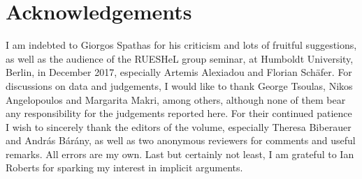 \documentclass[output=paper]{langsci/langscibook}
\begin{document}
\printchapterglossary{}

\section*{Acknowledgements}

I am indebted to Giorgos Spathas for his criticism and lots of fruitful
suggestions, as well as the audience of the RUESHeL group seminar, at Humboldt
University, Berlin, in December 2017, especially Artemis Alexiadou and Florian
Schäfer. For discussions on data and judgements, I would like to thank George
Tsoulas, Nikos Angelopoulos and Margarita Makri, among others, although none of
them bear any responsibility for the judgements reported here. For their
continued patience I wish to sincerely thank the editors of the volume,
especially Theresa Biberauer and András Bárány, as well as two anonymous
reviewers for comments and useful remarks. All errors are my own. Last but
certainly not least, I am grateful to Ian Roberts for sparking my interest in
implicit arguments.

{\sloppy
\printbibliography[heading=subbibliography,notkeyword=this]
}
\end{document}
